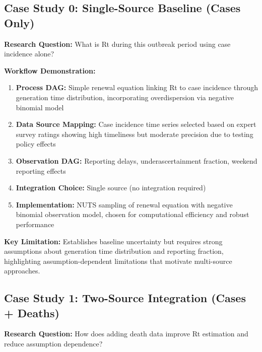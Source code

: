 \documentclass{article}
\begin{document}
\subsection{Case Study 0: Single-Source Baseline (Cases Only)}

\textbf{Research Question:} What is Rt during this outbreak period using case incidence alone?

\textbf{Workflow Demonstration:}
\begin{enumerate}
    \item \textbf{Process DAG:} Simple renewal equation linking Rt to case incidence through generation time distribution, incorporating overdispersion via negative binomial model
    \item \textbf{Data Source Mapping:} Case incidence time series selected based on expert survey ratings showing high timeliness but moderate precision due to testing policy effects
    \item \textbf{Observation DAG:} Reporting delays, underascertainment fraction, weekend reporting effects
    \item \textbf{Integration Choice:} Single source (no integration required)
    \item \textbf{Implementation:} NUTS sampling of renewal equation with negative binomial observation model, chosen for computational efficiency and robust performance
\end{enumerate}

\textbf{Key Limitation:} Establishes baseline uncertainty but requires strong assumptions about generation time distribution and reporting fraction, highlighting assumption-dependent limitations that motivate multi-source approaches.

\subsection{Case Study 1: Two-Source Integration (Cases + Deaths)}

\textbf{Research Question:} How does adding death data improve Rt estimation and reduce assumption dependence?
\end{document}
